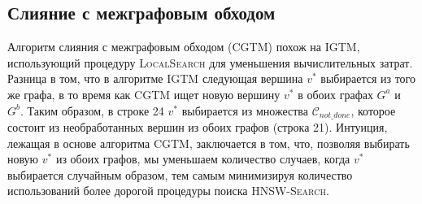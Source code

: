 \documentclass{article}
\begin{document}
\subsection{Слияние с межграфовым обходом}

Алгоритм слияния с межграфовым обходом (\textsc{CGTM}) похож на \textsc{IGTM}, использующий процедуру \textsc{LocalSearch} для уменьшения вычислительных затрат. Разница в том, что в алгоритме \textsc{IGTM} следующая вершина $v^*$ выбирается из того же графа, в то время как \textsc{CGTM} ищет новую вершину $v^*$ в обоих графах $G^a$ и $G^b$. 
Таким образом, в строке 24 $v^*$ выбирается из множества $\mathcal{C}_{not\_done}$, которое состоит из необработанных вершин из обоих графов (строка 21). Интуиция, лежащая в основе алгоритма \textsc{CGTM}, заключается в том, что, позволяя выбирать новую $v^*$ из обоих графов, мы уменьшаем количество случаев, когда $v^*$ выбирается случайным образом, тем самым минимизируя количество использований более дорогой процедуры поиска \textsc{HNSW-Search}.
\end{document}
